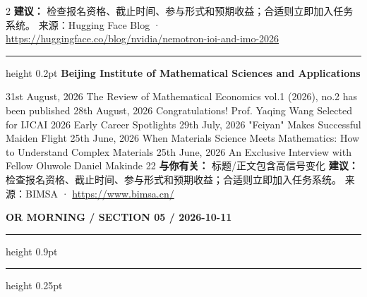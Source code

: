 \documentclass[10.5pt]{ctexart}
\begin{document}
\begin{multicols}{2}
\textbf{建议：} 检查报名资格、截止时间、参与形式和预期收益；合适则立即加入任务系统。
{\footnotesize\color{ormuted} 来源：Hugging Face Blog · \url{https://huggingface.co/blog/nvidia/nemotron-ioi-and-imo-2026}}
\vspace{2mm}
\hrule height 0.2pt
\vspace{2mm}
{\large\bfseries Beijing Institute of Mathematical Sciences and Applications}\par
31st August, 2026 The Review of Mathematical Economics vol.1 (2026), no.2 has been published 28th August, 2026 Congratulations! Prof. Yaqing Wang Selected for IJCAI 2026 Early Career Spotlights 29th July, 2026 "Feiyan" Makes Successful Maiden Flight 25th June, 2026 When Materials Science Meets Mathematics: How to Understand Complex Materials 25th June, 2026 An Exclusive Interview with Fellow Oluwole Daniel Makinde 22
\textbf{与你有关：} 标题/正文包含高信号变化
\textbf{建议：} 检查报名资格、截止时间、参与形式和预期收益；合适则立即加入任务系统。
{\footnotesize\color{ormuted} 来源：BIMSA · \url{https://www.bimsa.cn/}}
\end{multicols}
\newpage
{\small\bfseries OR MORNING / SECTION 05 / 2026-10-11}
\vspace{2mm}
\hrule height 0.9pt
\vspace{1.5mm}
\hrule height 0.25pt
\vspace{4mm}
\end{document}
